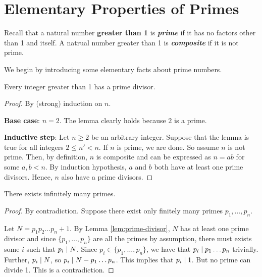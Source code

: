 



\section{Elementary Properties of Primes}

Recall that a natural number \textbf{greater than 1} is \textit{\textbf{prime}} if it has no factors other than 1 and itself. A natrual number greater than 1 is \textit{\textbf{composite}} if it is not prime.

We begin by introducing some elementary facts about prime numbers.

\begin{lemma} \label{lem:prime-divisor}
    Every integer greater than 1 has a prime divisor.
\end{lemma}

\begin{proof}
    By (strong) induction on $n$.

    \textbf{Base case}: $n = 2$. The lemma clearly holds because $2$ is a prime.

    \textbf{Inductive step}: Let $n \geq 2$ be an arbitrary integer. Suppose that the lemma is true for all integers $2 \leq n' < n$. If $n$ is prime, we are done. So assume $n$ is not prime. Then, by definition, $n$ is composite and can be expressed as $n = ab$ for some $a,b < n$. By induction hypothesis, $a$ and $b$ both have at least one prime divisors. Hence, $n$ also have a prime divisors.
\end{proof}

\begin{theorem}
   There exists infinitely many primes. 
\end{theorem}

\begin{proof}
    By contradiction. Suppose there exist only finitely many primes $p_1,\ldots,p_n$.

    Let $N = p_1p_2\ldots p_n + 1$. By Lemma \ref{lem:prime-divisor}, $N$ has at least one prime divisor and since $\{p_1,\ldots,p_n\}$ are all the primes by assumption, there must exists some $i$ such that $p_i \mathrel{\mid} N$. Since $p_i \in \{p_1,\ldots,p_n\}$, we have that $p_i \mathrel{\mid} p_1\ldots p_n$ trivially. Further, $p_i \mathrel{\mid} N$, so $p_i \mathrel{\mid} N - p_1\ldots p_n$. This implies that $p_i \mathrel{\mid} 1$. But no prime can divide 1. This is a contradiction.
\end{proof}

